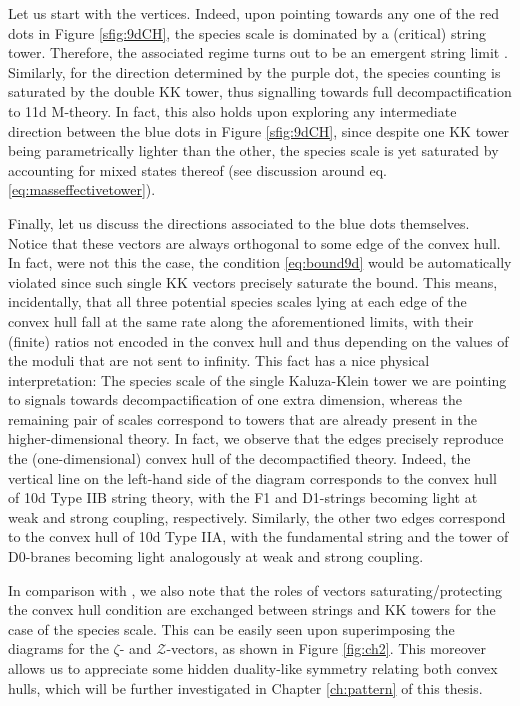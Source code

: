 Let us start with the vertices. Indeed, upon pointing towards any one of the red dots in Figure \ref{sfig:9dCH}, the species scale is dominated by a (critical) string tower. Therefore, the associated regime turns out to be an emergent string limit \cite{Lee:2019wij}. Similarly, for the direction determined by the purple dot, the species counting is saturated by the double KK tower, thus signalling towards full decompactification to 11d M-theory. In fact, this also holds upon exploring any intermediate direction between the blue dots in Figure \ref{sfig:9dCH}, since despite one KK tower being parametrically lighter than the other, the species scale is yet saturated by accounting for mixed states thereof (see discussion around eq. \eqref{eq:masseffectivetower}).

Finally, let us discuss the directions associated to the blue dots themselves. Notice that these vectors are always orthogonal to some edge of the convex hull. In fact, were not this the case, the condition \eqref{eq:bound9d} would be automatically violated since such single KK vectors precisely saturate the bound. This means, incidentally, that all three potential species scales lying at each edge of the convex hull fall at the same rate along the aforementioned limits, with their (finite) ratios not encoded in the convex hull and thus depending on the values of the moduli that are not sent to infinity. This fact has a nice physical interpretation: The species scale of the single Kaluza-Klein tower we are pointing to signals towards decompactification of one extra dimension, whereas the remaining pair of scales correspond to towers that are already present in the higher-dimensional theory. In fact, we observe that the edges precisely reproduce the (one-dimensional) convex hull of the decompactified theory. Indeed, the vertical line on the left-hand side of the diagram corresponds to the convex hull of 10d Type IIB string theory, with the F1 and D1-strings becoming light at weak and strong coupling, respectively. Similarly, the other two edges correspond to the convex hull of 10d Type IIA, with the fundamental string and the tower of D0-branes becoming light analogously at weak and strong coupling. 

In comparison with \cite{Etheredge:2022opl}, we also note that the roles of vectors saturating/protecting the convex hull condition are exchanged between strings and KK towers for the case of the species scale. This can be easily seen upon superimposing the diagrams for the $\zeta$- and $\mathcal{Z}$-vectors, as shown in Figure \ref{fig:ch2}. This moreover allows us to appreciate some hidden duality-like symmetry relating both convex hulls, which will be further investigated in Chapter \ref{ch:pattern} of this thesis.

